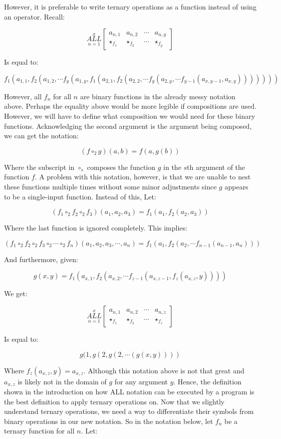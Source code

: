 \documentclass{article}
\begin{document}
However, it is preferable to write ternary operations as a function instead of using an operator. Recall:

$$\underset{n=1}{\overset{x}{ALL}} \begin{bmatrix}
a_{n,1} & a_{n,2} & \cdots & a_{n,y} \\
\star_{f_1} & \star_{f_2} & \cdots & \star_{f_y}
\end{bmatrix}$$

Is equal to:

$$f_1(a_{1,1}, f_2(a_{1,2}, \cdots f_y (a_{1,y}, f_1(a_{2,1}, f_2 (a_{2,2}, \cdots f_y(a_{2,y}, \cdots f_{y-1}(a_{x,y-1},a_{x,y} ) ) ) ) ) ) )$$

However, all $f_n$ for all $n$ are binary functions in the already messy notation above. Perhaps the equality above would be more legible if compositions are used. However, we will have to define what composition we would need for these binary functions. Acknowledging the second argument is the argument being composed, we can get the notation:

$$(f \circ_2 g)(a,b)=f(a,g(b))$$

Where the subscript in $\circ_s$ composes the function $g$ in the $s$th argument of the function $f$. A problem with this notation, however, is that we are unable to nest these functions multiple times without some minor adjustments since $g$ appears to be a single-input function. Instead of this, Let:

$$(f_1 \circ_2 f_2 \circ_2 f_3)(a_1,a_2,a_3)=f_1(a_1,f_2(a_2,a_3))$$

Where the last function is ignored completely. This implies:

 $$(f_1 \circ_2 f_2 \circ_2 f_3 \circ_2 \cdots \circ_2 f_n)(a_1,a_2,a_3,\cdots,a_n)=f_1(a_1,f_2(a_2,\cdots f_{n-1}(a_{n-1},a_n)))$$

And furthermore, given:

$$g(x,y)=f_1(a_{x,1},f_2(a_{x,2},\cdots f_{z-1}(a_{x,z-1},f_{z}(a_{x,z},y))))$$

We get:

$$\underset{n=1}{\overset{x}{ALL}} \begin{bmatrix}
a_{n,1} & a_{n,2} & \cdots & a_{n,z} \\
\star_{f_1} & \star_{f_2} & \cdots & \star_{f_z}
\end{bmatrix}$$

Is equal to:

$$g(1,g(2,g(2,\cdots(g(x,y))))$$

Where $f_{z}(a_{x,z},y)=a_{x,z}$. Although this notation above is not that great and $a_{x,z}$ is likely not in the domain of $g$ for any argument $y$. Hence, the definition shown in the introduction on how ALL notation can be executed by a program is the best definition to apply ternary operations on. Now that we slightly understand ternary operations, we need a way to differentiate their symbols from binary operations in our new notation. So in the notation below, let $f_n$ be a ternary function for all $n$. Let:
\end{document}
